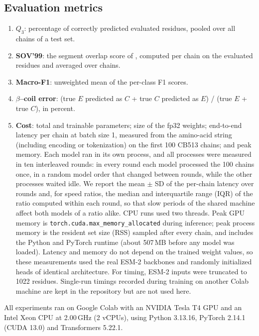 \documentclass[preprint,12pt,authoryear]{elsarticle}
\begin{document}
\subsection{Evaluation metrics}
\begin{enumerate}
    \item \textbf{$Q_3$}: percentage of correctly predicted evaluated residues, pooled over all chains of a test set.
    \item \textbf{SOV'99}: the segment overlap score of \citet{zemla1999modified}, computed per chain on the evaluated residues and averaged over chains.
    \item \textbf{Macro-F1}: unweighted mean of the per-class F1 scores.
    \item \textbf{$\beta$--coil error}: (true $E$ predicted as $C$ + true $C$ predicted as $E$) / (true $E$ + true $C$), in percent.
    \item \textbf{Cost}: total and trainable parameters; size of the fp32 weights; end-to-end latency per chain at batch size 1, measured from the amino-acid string (including encoding or tokenization) on the first 100 CB513 chains; and peak memory. Each model ran in its own process, and all processes were measured in ten interleaved rounds: in every round each model processed the 100 chains once, in a random model order that changed between rounds, while the other processes waited idle. We report the mean $\pm$ SD of the per-chain latency over rounds and, for speed ratios, the median and interquartile range (IQR) of the ratio computed within each round, so that slow periods of the shared machine affect both models of a ratio alike. CPU runs used two threads. Peak GPU memory is \texttt{torch.cuda.max\_memory\_allocated} during inference; peak process memory is the resident set size (RSS) sampled after every chain, and includes the Python and PyTorch runtime (about 507\,MB before any model was loaded). Latency and memory do not depend on the trained weight values, so these measurements used the real ESM-2 backbones and randomly initialized heads of identical architecture. For timing, ESM-2 inputs were truncated to 1022 residues. Single-run timings recorded during training on another Colab machine are kept in the repository but are not used here.
\end{enumerate}
All experiments ran on Google Colab with an NVIDIA Tesla T4 GPU and an Intel Xeon CPU at 2.00\,GHz (2 vCPUs), using Python 3.13.16, PyTorch 2.14.1 (CUDA 13.0) and Transformers 5.22.1.
\end{document}
